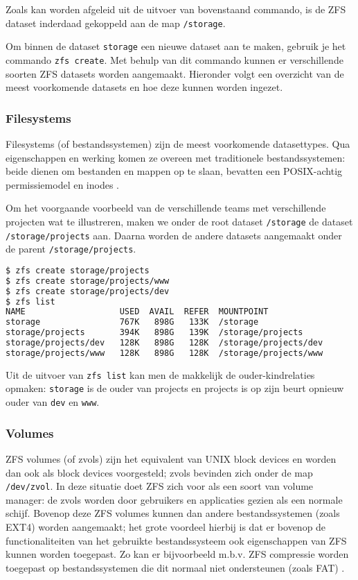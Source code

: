 Zoals kan worden afgeleid uit de uitvoer van bovenstaand commando, is de ZFS dataset inderdaad gekoppeld aan de map \texttt{/storage}.

Om binnen de dataset \texttt{storage} een nieuwe dataset aan te maken, gebruik je het commando \texttt{zfs create}. Met behulp van dit commando kunnen er verschillende soorten ZFS datasets worden aangemaakt. Hieronder volgt een overzicht van de meest voorkomende datasets en hoe deze kunnen worden ingezet.

\subsubsection{Filesystems}

Filesystems (of bestandssystemen) zijn de meest voorkomende datasettypes. Qua eigenschappen en werking komen ze overeen met traditionele bestandssystemen: beide dienen om bestanden en mappen op te slaan, bevatten een POSIX-achtig permissiemodel en inodes \autocite{Lucas2015}. 

Om het voorgaande voorbeeld van de verschillende teams met verschillende projecten wat te illustreren, maken we onder de root dataset \texttt{/storage} de dataset \texttt{/storage/projects} aan. Daarna worden de andere datasets aangemaakt onder de parent \texttt{/storage/projects}.

\begin{lstlisting}[language=bash,style=command_style] 
$ zfs create storage/projects
$ zfs create storage/projects/www
$ zfs create storage/projects/dev
$ zfs list
NAME                   USED  AVAIL  REFER  MOUNTPOINT
storage                767K   898G   133K  /storage
storage/projects       394K   898G   139K  /storage/projects
storage/projects/dev   128K   898G   128K  /storage/projects/dev
storage/projects/www   128K   898G   128K  /storage/projects/www
\end{lstlisting}

Uit de uitvoer van \texttt{zfs list} kan men de makkelijk de ouder-kindrelaties opmaken: \texttt{storage} is de ouder van projects en projects is op zijn beurt opnieuw ouder van \texttt{dev} en \texttt{www}.

\subsubsection{Volumes}

ZFS volumes (of zvols) zijn het equivalent van UNIX block devices en worden dan ook als block devices voorgesteld; zvols bevinden zich onder de map \texttt{/dev/zvol}. In deze situatie doet ZFS zich voor als een soort van volume manager: de zvols worden door gebruikers en applicaties gezien als een normale schijf. Bovenop deze ZFS volumes kunnen dan andere bestandssystemen (zoals EXT4) worden aangemaakt; het grote voordeel hierbij is dat er bovenop de functionaliteiten van het gebruikte bestandssysteem ook eigenschappen van ZFS kunnen worden toegepast. Zo kan er bijvoorbeeld m.b.v. ZFS compressie worden toegepast op bestandssystemen die dit normaal niet ondersteunen (zoals FAT) \autocite{FBSDDP2017}.

